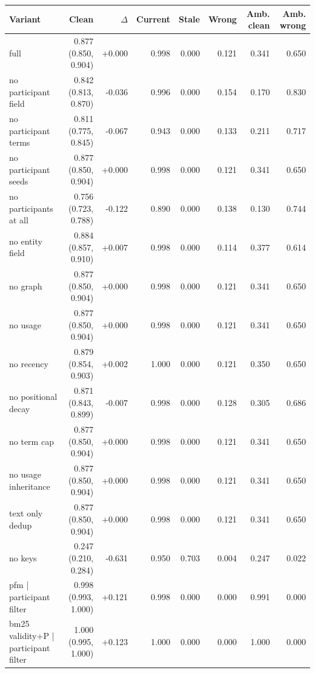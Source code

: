 \documentclass{article} %
\begin{document}
\begin{table}[h]
\centering
\scriptsize
\setlength{\tabcolsep}{4pt}
\begin{tabular}{@{}lrrrrrrr@{}}
\toprule
Variant & Clean & $\Delta$ & Current & Stale & Wrong & Amb. clean & Amb. wrong \\
\midrule
full & 0.877 {\scriptsize(0.850, 0.904)} & +0.000 & 0.998 & 0.000 & 0.121 & 0.341 & 0.650 \\
no participant field & 0.842 {\scriptsize(0.813, 0.870)} & -0.036 & 0.996 & 0.000 & 0.154 & 0.170 & 0.830 \\
no participant terms & 0.811 {\scriptsize(0.775, 0.845)} & -0.067 & 0.943 & 0.000 & 0.133 & 0.211 & 0.717 \\
no participant seeds & 0.877 {\scriptsize(0.850, 0.904)} & +0.000 & 0.998 & 0.000 & 0.121 & 0.341 & 0.650 \\
no participants at all & 0.756 {\scriptsize(0.723, 0.788)} & -0.122 & 0.890 & 0.000 & 0.138 & 0.130 & 0.744 \\
no entity field & 0.884 {\scriptsize(0.857, 0.910)} & +0.007 & 0.998 & 0.000 & 0.114 & 0.377 & 0.614 \\
no graph & 0.877 {\scriptsize(0.850, 0.904)} & +0.000 & 0.998 & 0.000 & 0.121 & 0.341 & 0.650 \\
no usage & 0.877 {\scriptsize(0.850, 0.904)} & +0.000 & 0.998 & 0.000 & 0.121 & 0.341 & 0.650 \\
no recency & 0.879 {\scriptsize(0.854, 0.903)} & +0.002 & 1.000 & 0.000 & 0.121 & 0.350 & 0.650 \\
no positional decay & 0.871 {\scriptsize(0.843, 0.899)} & -0.007 & 0.998 & 0.000 & 0.128 & 0.305 & 0.686 \\
no term cap & 0.877 {\scriptsize(0.850, 0.904)} & +0.000 & 0.998 & 0.000 & 0.121 & 0.341 & 0.650 \\
no usage inheritance & 0.877 {\scriptsize(0.850, 0.904)} & +0.000 & 0.998 & 0.000 & 0.121 & 0.341 & 0.650 \\
text only dedup & 0.877 {\scriptsize(0.850, 0.904)} & +0.000 & 0.998 & 0.000 & 0.121 & 0.341 & 0.650 \\
no keys & 0.247 {\scriptsize(0.210, 0.284)} & -0.631 & 0.950 & 0.703 & 0.004 & 0.247 & 0.022 \\
pfm | participant filter & 0.998 {\scriptsize(0.993, 1.000)} & +0.121 & 0.998 & 0.000 & 0.000 & 0.991 & 0.000 \\
bm25 validity+P | participant filter & 1.000 {\scriptsize(0.995, 1.000)} & +0.123 & 1.000 & 0.000 & 0.000 & 1.000 & 0.000 \\

\end{tabular}
\end{table}
\end{document}
